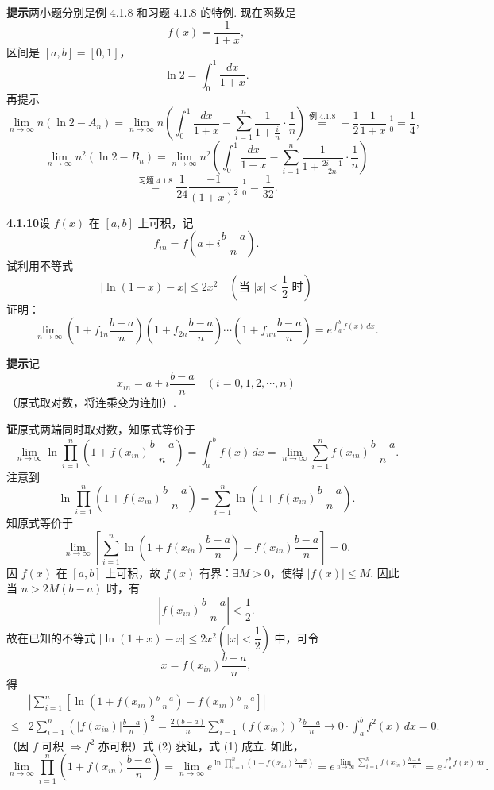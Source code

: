 \documentclass[UTF8,12pt,a4paper,fontset=fandol]{ctexart}
\begin{document}
\noindent\textbf{提示}\quad 两小题分别是例 4.1.8 和习题 4.1.8 的特例. 现在函数是
\[
f(x)=\frac1{1+x},
\]
区间是 $[a,b]=[0,1]$，
\[
\ln2=\int_0^1\frac{dx}{1+x}.
\]
再提示
\[
\lim_{n\to\infty}n(\ln2-A_n)
=\lim_{n\to\infty}n\left(\int_0^1\frac{dx}{1+x}
-\sum_{i=1}^n\frac1{1+\frac in}\cdot\frac1n\right)
\stackrel{\text{例 4.1.8}}{=}
-\frac12\frac1{1+x}\bigg|_0^1=\frac14,
\]
\[
\lim_{n\to\infty}n^2(\ln2-B_n)
=\lim_{n\to\infty}n^2\left(\int_0^1\frac{dx}{1+x}
-\sum_{i=1}^n\frac1{1+\frac{2i-1}{2n}}\cdot\frac1n\right)
\]
\[
\stackrel{\text{习题 4.1.8}}{=}
\frac1{24}\frac{-1}{(1+x)^2}\bigg|_0^1
=\frac1{32}.
\]

\noindent\textbf{4.1.10}\quad 设 $f(x)$ 在 $[a,b]$ 上可积，记
\[
f_{in}=f\left(a+i\frac{b-a}{n}\right).
\]
试利用不等式
\[
|\ln(1+x)-x|\le2x^2\quad\left(\text{当 }|x|<\frac12\text{ 时}\right)
\]
证明：
\[
\lim_{n\to\infty}
\left(1+f_{1n}\frac{b-a}{n}\right)
\left(1+f_{2n}\frac{b-a}{n}\right)\cdots
\left(1+f_{nn}\frac{b-a}{n}\right)
=e^{\int_a^b f(x)\,dx}.
\]

\noindent\textbf{提示}\quad 记
\[
x_{in}=a+i\frac{b-a}{n}\quad(i=0,1,2,\cdots,n)
\]
（原式取对数，将连乘变为连加）.

\noindent\textbf{证}\quad 原式两端同时取对数，知原式等价于
\[
\lim_{n\to\infty}\ln\prod_{i=1}^n
\left(1+f(x_{in})\frac{b-a}{n}\right)
=\int_a^b f(x)\,dx
=\lim_{n\to\infty}\sum_{i=1}^n f(x_{in})\frac{b-a}{n}.
\tag{1}
\]
注意到
\[
\ln\prod_{i=1}^n\left(1+f(x_{in})\frac{b-a}{n}\right)
=\sum_{i=1}^n\ln\left(1+f(x_{in})\frac{b-a}{n}\right).
\]
知原式等价于
\[
\lim_{n\to\infty}
\left[\sum_{i=1}^n
\ln\left(1+f(x_{in})\frac{b-a}{n}\right)
-f(x_{in})\frac{b-a}{n}\right]=0.
\tag{2}
\]
因 $f(x)$ 在 $[a,b]$ 上可积，故 $f(x)$ 有界：$\exists M>0$，使得 $|f(x)|\le M$. 因此当 $n>2M(b-a)$ 时，有
\[
\left|f(x_{in})\frac{b-a}{n}\right|<\frac12.
\]
故在已知的不等式 $|\ln(1+x)-x|\le2x^2\left(|x|<\dfrac12\right)$ 中，可令
\[
x=f(x_{in})\frac{b-a}{n},
\]
得
\[
\begin{aligned}
&\left|\sum_{i=1}^n\left[
\ln\left(1+f(x_{in})\frac{b-a}{n}\right)
-f(x_{in})\frac{b-a}{n}\right]\right|\\
\le{}&2\sum_{i=1}^n\left(|f(x_{in})|\frac{b-a}{n}\right)^2
=\frac{2(b-a)}{n}\sum_{i=1}^n(f(x_{in}))^2\frac{b-a}{n}
\longrightarrow0\cdot\int_a^b f^2(x)\,dx=0.
\end{aligned}
\]
（因 $f$ 可积 $\Rightarrow f^2$ 亦可积）式 (2) 获证，式 (1) 成立. 如此，
\[
\lim_{n\to\infty}\prod_{i=1}^n
\left(1+f(x_{in})\frac{b-a}{n}\right)
=\lim_{n\to\infty}
e^{\ln\prod_{i=1}^n(1+f(x_{in})\frac{b-a}{n})}
=e^{\lim_{n\to\infty}\sum_{i=1}^n f(x_{in})\frac{b-a}{n}}
=e^{\int_a^b f(x)\,dx}.
\]
\end{document}
